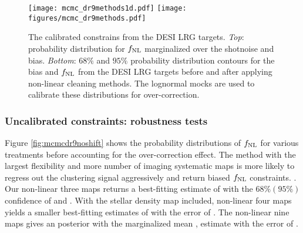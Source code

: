 \begin{figure}
    \raggedleft
    \texttt{[image: mcmc\_dr9methods1d.pdf]}
    \texttt{[image: figures/mcmc\_dr9methods.pdf]} 
    \caption{The calibrated constrains from the DESI LRG targets. \textit{Top}: probability distribution for $f_{\rm NL}$ marginalized over the shotnoise and bias. \textit{Bottom}: $68\%$ and $95\%$ probability distribution contours for the bias and $f_{\rm NL}$ from the DESI LRG targets before and after applying non-linear cleaning methods. The lognormal mocks are used to calibrate these distributions for over-correction.}\label{fig:mcmc_dr9}
\end{figure}

\subsubsection{Uncalibrated constraints: robustness tests}
Figure \ref{fig:mcmcdr9noshift} shows the probability distributions of $f_{\rm NL}$ for various treatments before accounting for the over-correction effect. The method with the largest flexibility and more number of imaging systematic maps is more likely to regress out the clustering signal aggressively and return biased $f_{\rm NL}$ constraints. . Our non-linear three maps returns a best-fitting estimate of  with the $68\%(95\%)$ confidence of  and . With the stellar density map included, non-linear four maps yields a smaller best-fitting estimates of  with the error of . The non-linear nine maps gives an  posterior with the marginalized mean ,  estimate  with the error of . 

